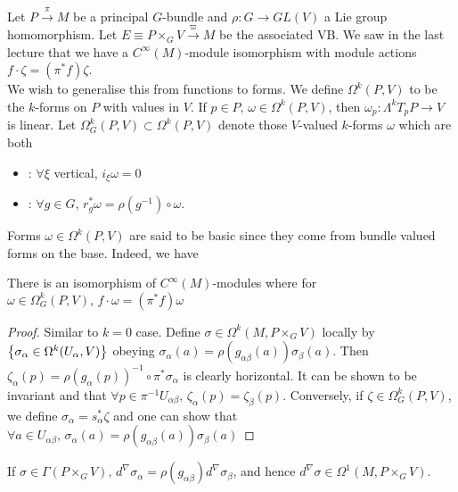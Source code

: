 \documentclass{article}
\begin{document}
Let $P \overset{\pi}{\to} M$ be a principal $G$-bundle and $\rho: G \to GL(V)$ a Lie group homomorphism. Let $E \equiv P \times_G V \overset{\varpi}{\to} M$ be the associated VB. We saw in the last lecture that we have a $C^\infty(M)$-module isomorphism 
with module actions $f \cdot \zeta = (\pi^\ast f) \zeta$. \\
We wish to generalise this from functions to forms. We define $\Omega^k(P,V)$ to be the $k$-forms on $P$ with values in $V$. If $p \in P, \,  \omega \in \Omega^k(P,V)$, then $\omega_p : \Lambda^k T_pP \to V$ is linear. Let $\Omega^k_G(P,V) \subset \Omega^k(P,V)$ denote those $V$-valued $k$-forms $\omega$ which are both 
\begin{itemize}
	\item {}: $\forall \xi$ vertical, $i_\xi \omega = 0$
	\item {}: $\forall g \in G$, $r_g^\ast \omega = \rho(g^{-1}) \circ \omega$. 
\end{itemize} 
Forms $\omega\in \Omega^k(P,V)$ are said to be basic since they come from bundle valued forms on the base. Indeed, we have 
\begin{prop}
	There is an isomorphism of $C^\infty(M)$-modules 
	where for $\omega \in \Omega^k_G(P,V), \, f \cdot \omega = (\pi^\ast f) \omega$
\end{prop}
\begin{proof}
	Similar to $k=0$ case. Define $\sigma \in \Omega^k(M,P\times_G V)$ locally by $\left\{ \sigma_\alpha \in \Omega^k(U_\alpha,V) \right\}$ obeying $\sigma_\alpha(a) = \rho(g_{\alpha\beta}(a)) \sigma_\beta(a)$. Then $\zeta_\alpha(p) = \rho(g_\alpha(p))^{-1} \circ \pi^\ast \sigma_\alpha$ is clearly horizontal. It can be shown to be invariant and that $\forall p \in \pi^{-1} U_{\alpha\beta}, \, \zeta_\alpha(p) = \zeta_\beta(p)$. Conversely, if $\zeta \in \Omega^k_G(P,V)$, we define $\sigma_\alpha = s_\alpha^\ast \zeta$ and one can show that $\forall a \in U_{\alpha\beta}, \, \sigma_\alpha(a) = \rho(g_{\alpha\beta}(a)) \sigma_\beta(a)$ 
\end{proof}

If $\sigma \in \Gamma(P \times_G V)$, $d^\nabla \sigma_\alpha = \rho(g_{\alpha\beta}) d^\nabla \sigma_\beta$, and hence $d^\nabla \sigma \in \Omega^1(M, P\times_G V)$. 
\end{document}
